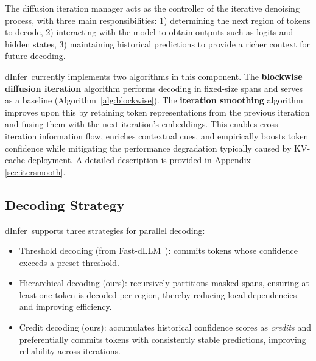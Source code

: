 \documentclass[]{antgroup}
\newcommand{\sys}{dInfer}
\newcommand{\fastdllm}{Fast-dLLM}
\begin{document}
The diffusion iteration manager acts as the controller of the iterative denoising process, with three main responsibilities: 1) determining the next region of tokens to decode, 2) interacting with the model to obtain outputs such as logits and hidden states, 3) maintaining historical predictions to provide a richer context for future decoding.

\sys~currently implements two algorithms in this component. The \textbf{blockwise diffusion iteration} algorithm performs decoding in fixed-size spans and serves as a baseline (Algorithm~\ref{alg:blockwise}). The \textbf{iteration smoothing} algorithm improves upon this by retaining token representations from the previous iteration and fusing them with the next iteration’s embeddings. This enables cross-iteration information flow, enriches contextual cues, and empirically boosts token confidence while mitigating the performance degradation typically caused by KV-cache deployment. A detailed description is provided in Appendix \ref{sec:itersmooth}.

\subsection{Decoding Strategy} \label{sec:para_dec}



\sys~supports three strategies for parallel decoding:
\begin{itemize}
\item Threshold decoding (from \fastdllm~\citep{wu2025fast}): commits tokens whose confidence exceeds a preset threshold.
\item Hierarchical decoding (ours): recursively partitions masked spans, ensuring at least one token is decoded per region, thereby reducing local dependencies and improving efficiency.
\item Credit decoding (ours): accumulates historical confidence scores as \textit{credits} and preferentially commits tokens with consistently stable predictions, improving reliability across iterations.
\end{itemize}
\end{document}
